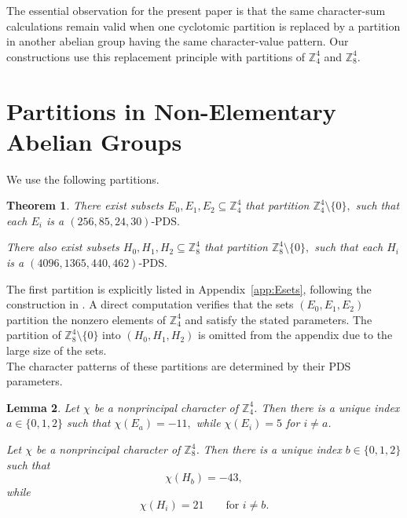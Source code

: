 \documentclass[11pt]{article}
\newtheorem{theorem}{Theorem}[section]
\newtheorem{lemma}[theorem]{Lemma}
\theoremstyle{definition}
\theoremstyle{remark}
\newcommand{\Z}{\mathbb{Z}}
\begin{document}
The essential observation for the present paper is that the same
character-sum calculations remain valid when one cyclotomic
partition is replaced by a partition in another abelian group having
the same character-value pattern. Our constructions use this
replacement principle with partitions of \(\Z_4^4\) and \(\Z_8^4\).


\section{Partitions in Non-Elementary Abelian Groups}
\label{sec:partitions}

We use the following partitions.

\begin{theorem}
\label{thm:partitions}
There exist subsets $E_0,E_1,E_2\subseteq\Z_4^4$
that partition $\Z_4^4\setminus\{0\},$
such that each \(E_i\) is a $(256,85,24,30)\text{-PDS}.$

There also exist subsets $H_0,H_1,H_2\subseteq\Z_8^4$
that partition $\Z_8^4\setminus\{0\},$
such that each \(H_i\) is a $(4096,1365,440,462)\text{-PDS}.$
\end{theorem}

%
%

The first partition is explicitly listed in Appendix~\ref{app:Esets}, following the construction in \cite{private}. A direct computation verifies that the sets $(E_0,E_1,E_2)$ partition the nonzero elements of $\Z_4^4$ and satisfy the stated parameters. The partition of $\Z_8^4\setminus{\{0\}}$ into $(H_0,H_1,H_2)$ is omitted from the appendix due to the large size of the sets.
 \\

The character patterns of these partitions are determined by their
PDS parameters.

\begin{lemma}
\label{lem:partition-character-patterns}
Let \(\chi\) be a nonprincipal character of \(\Z_4^4\). Then there
is a unique index \(a\in\{0,1,2\}\) such that $\chi(E_a)=-11,$ while $\chi(E_i)=5$ for $i\neq a$.

Let \(\chi\) be a nonprincipal character of \(\Z_8^4\). Then there
is a unique index \(b\in\{0,1,2\}\) such that
\[
\chi(H_b)=-43,
\]
while
\[
\chi(H_i)=21
\qquad
\text{for }i\neq b.
\]
\end{lemma}
\end{document}
